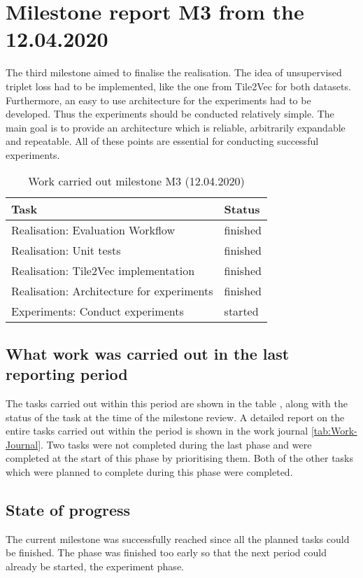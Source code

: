 \section{Milestone report M3 from the 12.04.2020}
The third milestone aimed to finalise the realisation. The idea of unsupervised triplet loss had to be implemented, like the one from Tile2Vec for both datasets. Furthermore, an easy to use architecture for the experiments had to be developed. Thus the experiments should be conducted relatively simple. The main goal is to provide an architecture which is reliable, arbitrarily expandable and repeatable. All of these points are essential for conducting successful experiments.

\begin{table}[htbp]
    \centering
    \caption{Work carried out milestone M3 (12.04.2020)}
	\label{tab:Work-Carried-Out-M3}
    \begin{tabular}{p{} | p{}}
        \toprule
        \textbf{Task} & \textbf{Status} \\ 
        \midrule[1pt]
        Realisation: Evaluation Workflow & finished \\
        \hline
        Realisation: Unit tests & finished \\
        \hline
        Realisation: Tile2Vec implementation & finished \\
        \hline
        Realisation: Architecture for experiments & finished \\
        \hline
        Experiments: Conduct experiments & started \\
        \bottomrule
    \end{tabular}
\end{table}

\subsection{What work was carried out in the last reporting period}
The tasks carried out within this period are shown in the table , along with the status of the task at the time of the milestone review. A detailed report on the entire tasks carried out within the period is shown in the work journal \ref{tab:Work-Journal}. Two tasks were not completed during the last phase and were completed at the start of this phase by prioritising them. Both of the other tasks which were planned to complete during this phase were completed.

\subsection{State of progress}
The current milestone was successfully reached since all the planned tasks could be finished. The phase was finished too early so that the next period could already be started, the experiment phase. 

